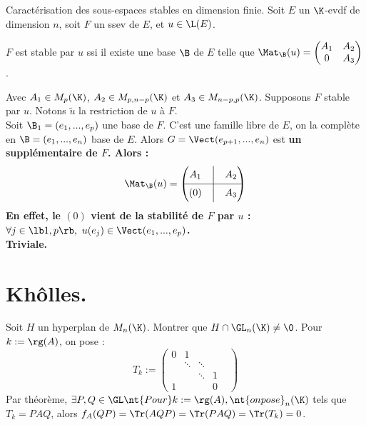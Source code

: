 \documentclass[11pt]{article}
\begin{document}
\vspace*{-0.4cm}

\begin{thm}{Caractérisation des sous-espaces stables en dimension finie.}{}
    Soit $E$ un $\K$-evdf de dimension $n$, soit $F$ un ssev de $E$, et $u\in\L(E)$.
    \begin{center}
        $F$ est stable par $u$ ssi il existe une base $\B$ de $E$ telle que $\Mat_{\B}(u)=\begin{pmatrix}A_1&A_2\\0&A_3\end{pmatrix}$.
    \end{center}
    Avec $A_1\in M_{p}(\K)$, $A_2\in M_{p,n-p}(\K)$ et $A_3\in M_{n-p,p}(\K)$.
    \tcblower
    \boxed{\ra} Supposons $F$ stable par $u$. Notons $\tilde{u}$ la restriction de $u$ à $F$.\\
    Soit $\B_1=(e_1,...,e_p)$ une base de $F$. C'est une famille libre de $E$, on la complète en $\B=(e_1,...,e_n)$ base de $E$. Alors $G=\Vect(e_{p+1},...,e_n)$ est \bf{un} supplémentaire de $F$. Alors :
    \begin{equation*}
        \Mat_{\B}(u)=\begin{pmatrix}A_1&\Big|&A_2\\\hline(0)&\Big|&A_3\end{pmatrix}
    \end{equation*}
    En effet, le $(0)$ vient de la stabilité de $F$ par $u$ : $\forall j \in \lb1,p\rb, ~ u(e_j)\in\Vect(e_1,...,e_p)$.\\
    \boxed{\la} Triviale.
\end{thm}

\section{Khôlles.}

\begin{exercice}{}{}
    Soit $H$ un hyperplan de $M_n(\K)$. Montrer que $H\cap \GL_n(\K)\neq\0$.
    \tcblower
    Pour $k := \rg(A)$, on pose : 
    \begin{equation*}
       T_k := \begin{pmatrix}
            0 & 1 & & \\ & \ddots & \ddots & & \\ & & \ddots & 1 & \\ 1 & & & 0
        \end{pmatrix}
    \end{equation*}
    Par théorème, $\exists P,Q\in\GL \nt{Pour } k := \rg(A), \nt{ on pose } _n(\K)$ tels que $T_k=PAQ$, alors $f_A(QP)=\Tr(AQP)=\Tr(PAQ)=\Tr(T_k)=0$.
\end{exercice}
\end{document}
